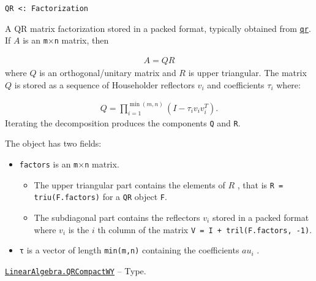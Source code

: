 \begin{adjustwidth}{2em}{0pt}


\begin{verbatim}
QR <: Factorization
\end{verbatim}

A QR matrix factorization stored in a packed format, typically obtained from \hyperlink{4122539696772350360}{\texttt{qr}}. If  \(A\)  is an \texttt{m}×\texttt{n} matrix, then

\begin{equation*}
\begin{split}A = Q R\end{split}\end{equation*}
where  \(Q\)  is an orthogonal/unitary matrix and  \(R\)  is upper triangular. The matrix  \(Q\)  is stored as a sequence of Householder reflectors  \(v_i\)  and coefficients  \(\tau_i\)  where:

\begin{equation*}
\begin{split}Q = \prod_{i=1}^{\min(m,n)} (I - \tau_i v_i v_i^T).\end{split}\end{equation*}
Iterating the decomposition produces the components \texttt{Q} and \texttt{R}.

The object has two fields:

\begin{itemize}
\item \texttt{factors} is an \texttt{m}×\texttt{n} matrix.

\begin{itemize}
\item The upper triangular part contains the elements of  \(R\) , that is \texttt{R = triu(F.factors)} for a \texttt{QR} object \texttt{F}.


\item The subdiagonal part contains the reflectors  \(v_i\)  stored in a packed format where  \(v_i\)  is the  \(i\) th column of the matrix \texttt{V = I + tril(F.factors, -1)}.

\end{itemize}

\item \texttt{τ} is a vector  of length \texttt{min(m,n)} containing the coefficients  \(au_i\) .

\end{itemize}


\end{adjustwidth}
\hypertarget{15814215390089782499}{} 
\hyperlink{15814215390089782499}{\texttt{LinearAlgebra.QRCompactWY}}  -- {Type.}


